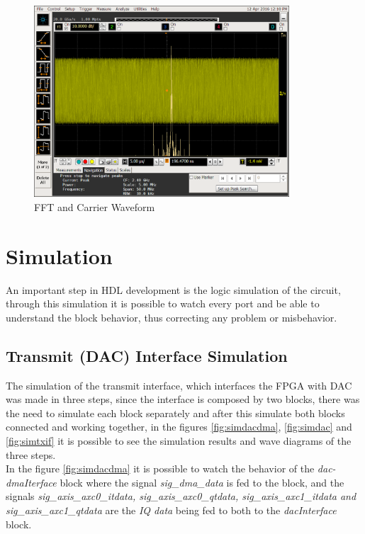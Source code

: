 \begin{figure}[htbp]
    \centering
    \includegraphics[width=0.85\textwidth]{./figures/oscill_fft}
    \caption{ FFT and Carrier Waveform
    \label{fig:oscillfft}}
\end{figure}

\section{Simulation}

An important step in HDL development is the logic simulation of the circuit,
through this simulation it is possible to watch every port and be able to
understand the block behavior, thus correcting any problem or misbehavior.\\

\subsection{Transmit (DAC) Interface Simulation}

The simulation of the transmit interface, which interfaces the FPGA with DAC was
made in three steps, since the interface is composed by two blocks, there was
the need to simulate each block separately and after this simulate both blocks
connected and working together, in the figures \ref{fig:simdacdma},
\ref{fig:simdac} and \ref{fig:simtxif} it is possible to see the simulation
results and wave diagrams of the three steps.\\

In the figure \ref{fig:simdacdma} it is possible to watch the behavior of the
\textit{dac-dmaIterface} block where the signal \textit{sig\_dma\_data} is fed to
the block, and the signals \textit{ sig\_axis\_axc0\_itdata, sig\_axis\_axc0\_qtdata,
sig\_axis\_axc1\_itdata and sig\_axis\_axc1\_qtdata} are the \textit{IQ data} being
fed to both to the \textit{dacInterface} block.\\

